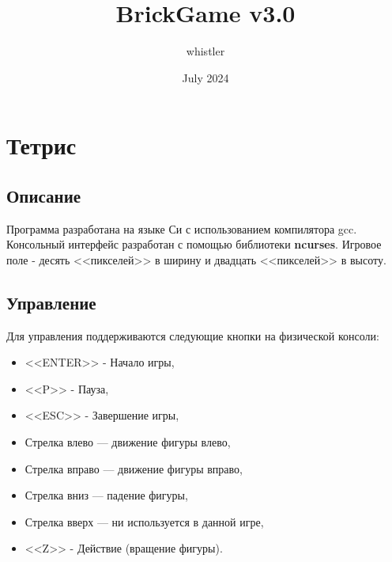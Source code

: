 \documentclass{article}
\title{BrickGame v3.0}
\author{whistler}
\date{July 2024}
\begin{document}
\maketitle
\section{Тетрис}
\subsection{Описание}
\small Программа разработана на языке Си с использованием компилятора gcc.
Консольный интерфейс разработан с помощью библиотеки \textbf{ncurses}.
Игровое поле - десять <<пикселей>> в ширину и двадцать <<пикселей>> в высоту.

\subsection{Управление}
Для управления поддерживаются следующие кнопки на физической консоли:
\begin{itemize}
    \item <<ENTER>> - Начало игры,
    \item <<P>> - Пауза,
    \item <<ESC>> - Завершение игры,
    \item Стрелка влево — движение фигуры влево,
    \item Стрелка вправо — движение фигуры вправо,
    \item Стрелка вниз — падение фигуры,
    \item Стрелка вверх — ни используется в данной игре,
    \item <<Z>> - Действие (вращение фигуры).

\end{itemize}
\end{document}

